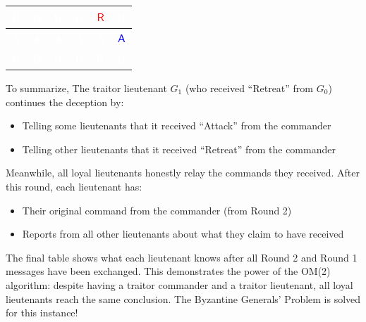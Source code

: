 \documentclass[11pt]{article}
\newcommand{\cmdA}{\ensuremath{\mathsf{A}}} %
\newcommand{\cmdR}{\ensuremath{\mathsf{R}}} %
\newcommand{\gen}[1]{\ensuremath{G_{#1}}}
\begin{document}
\begin{center}
\begin{tabular}{c|c|c|c|c|c}
    \hline
    \cellcolor{red!75}\textbf{\textcolor{white}{R}} & \cellcolor{red!75}\textbf{\textcolor{white}{R}} & \cellcolor{red!75}\textbf{\textcolor{white}{R}} & \cellcolor{red!75}\textbf{\textcolor{white}{R}} & \cellcolor{yellow!30}\textbf{\textcolor{red}{\cmdR}} & \cellcolor{red!75}\textbf{\textcolor{white}{R}} \\
    \hline
    \cellcolor{blue!75}\textbf{\textcolor{white}{A}} & \cellcolor{blue!75}\textbf{\textcolor{white}{A}} & \cellcolor{blue!75}\textbf{\textcolor{white}{A}} & \cellcolor{blue!75}\textbf{\textcolor{white}{A}} & \cellcolor{blue!75}\textbf{\textcolor{white}{A}} & \cellcolor{yellow!30}\textbf{\textcolor{blue}{\cmdA}} \\
    \hline
    \hline
    \cellcolor{red!45}\textbf{\textcolor{white}{R}} & \cellcolor{red!75}\textbf{\textcolor{white}{R}} & \cellcolor{red!75}\textbf{\textcolor{white}{R}} & \cellcolor{red!75}\textbf{\textcolor{white}{R}} & \cellcolor{red!75}\textbf{\textcolor{white}{R}} & \cellcolor{red!75}\textbf{\textcolor{white}{R}} \\
\end{tabular}
\label{tab:traitor_commander_final_table}
\end{center}

\par\vspace{0.3em}


\justifying
To summarize, The traitor lieutenant $\gen{1}$ (who received ``Retreat'' from $\gen{0}$) continues the deception by:
\begin{itemize}
    \item Telling some lieutenants that it received ``Attack'' from the commander
    \item Telling other lieutenants that it received ``Retreat'' from the commander
\end{itemize}

Meanwhile, all loyal lieutenants honestly relay the commands they received. After this round, each lieutenant has:
\begin{itemize}
    \item Their original command from the commander (from Round 2)
    \item Reports from all other lieutenants about what they claim to have received
\end{itemize}

The final table shows what each lieutenant knows after all Round 2 and Round 1 messages have been exchanged.
This demonstrates the power of the OM(2) algorithm: despite having a traitor commander and a traitor lieutenant, all loyal lieutenants reach the same conclusion. The Byzantine Generals' Problem is solved for this instance!
\end{document}
